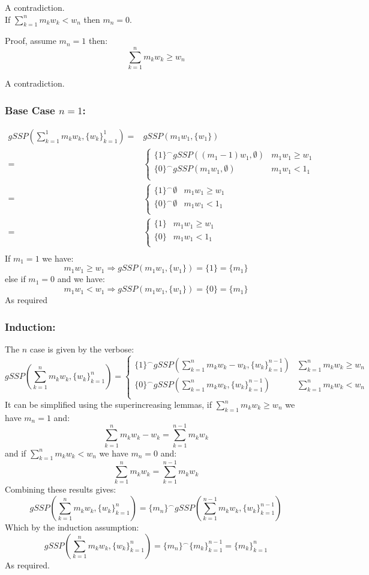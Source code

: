 A contradiction.
\\
If $\sum_{k=1}^nm_kw_k < w_n$ then $m_n = 0$.

Proof, assume $m_n = 1$ then:
\[\sum_{k=1}^nm_kw_k \geq w_n\]

A contradiction.
\subsubsection{Base Case $n=1$:}

\begin{equation*}
\begin{aligned}
	gSSP\left(\sum_{k=1}^1m_kw_k,\{w_k\}_{k=1}^1\right) 
	=&gSSP\left(m_1w_1,\{w_1\}\right)\\
	=&\begin{cases} 
		\{1\}^\frown gSSP((m_1-1)w_1,\emptyset) & m_1w_1 \geq w_1\\
		\{0\}^\frown gSSP(m_1w_1,\emptyset) & m_1w_1 < 1_1\\
	\end{cases}\\
	=&\begin{cases} 
		\{1\}^\frown \emptyset & m_1w_1 \geq w_1\\
		\{0\}^\frown \emptyset & m_1w_1 < 1_1\\
	\end{cases}\\
	=&\begin{cases} 
		\{1\} & m_1w_1 \geq w_1\\
		\{0\} & m_1w_1 < 1_1\\
	\end{cases}\\
\end{aligned}
\end{equation*}
If $m_1=1$ we have:
\[m_1w_1\geq w_1 \Rightarrow gSSP(m_1w_1,\{w_1\}) = \{1\} = \{m_1\}\]
else if $m_1=0$ and we have:
\[m_1w_1 < w_1 \Rightarrow gSSP(m_1w_1,\{w_1\}) = \{0\} = \{m_1\}\]
As required 

\subsubsection{Induction:}
The $n$ case is given by the verbose:
\[gSSP\left(\sum_{k=1}^nm_kw_k,\{w_k\}_{k=1}^n\right) = 
	\begin{cases}
	\{1\}^\frown gSSP\left(\sum_{k=1}^nm_kw_k-w_k,\{w_k\}_{k=1}^{n-1}\right)& \sum_{k=1}^nm_kw_k \geq w_n \\
	\{0\}^\frown gSSP\left(\sum_{k=1}^nm_kw_k,\{w_k\}_{k=1}^{n-1}\right)& \sum_{k=1}^nm_kw_k < w_n \\
	\end{cases}
\]
It can be simplified using the superincreasing lemmas,
if $\sum_{k=1}^nm_kw_k \geq w_n $ we have $m_n = 1$ and:
\[\sum_{k=1}^nm_kw_k -w_k = \sum_{k=1}^{n-1}m_kw_k\]
and if $\sum_{k=1}^nm_kw_k < w_n $ we have $m_n = 0$ and:
\[\sum_{k=1}^nm_kw_k = \sum_{k=1}^{n-1}m_kw_k\]
Combining these results gives:
\[gSSP\left(\sum_{k=1}^nm_kw_k,\{w_k\}_{k=1}^n\right) = 
\{m_n\}^\frown gSSP\left(\sum_{k=1}^{n-1}m_kw_k,\{w_k\}_{k=1}^{n-1}\right)
\]
Which by the induction assumption:
\[gSSP\left(\sum_{k=1}^nm_kw_k,\{w_k\}_{k=1}^n\right) = \{m_n\}^\frown \{m_k\}_{k=1}^{n-1} = \{m_k\}_{k=1}^n\]
As required.

